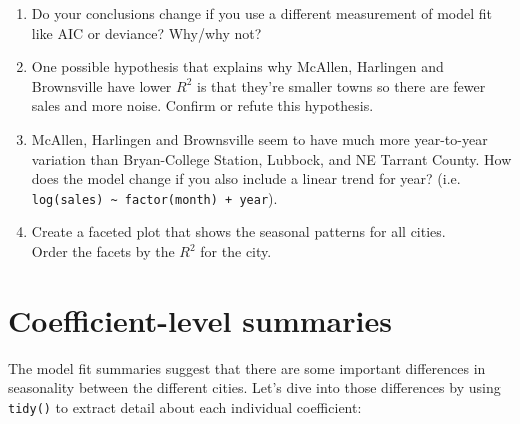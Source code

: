 \begin{enumerate}
\def\labelenumi{\arabic{enumi}.}
\item
  Do your conclusions change if you use a different measurement of model
  fit like AIC or deviance? Why/why not?
\item
  One possible hypothesis that explains why McAllen, Harlingen and
  Brownsville have lower \(R^2\) is that they're smaller towns so there
  are fewer sales and more noise. Confirm or refute this hypothesis.
\item
  McAllen, Harlingen and Brownsville seem to have much more year-to-year
  variation than Bryan-College Station, Lubbock, and NE Tarrant County.
  How does the model change if you also include a linear trend for year?
  (i.e. \texttt{log(sales)\ \textasciitilde{}\ factor(month)\ +\ year}).
\item
  Create a faceted plot that shows the seasonal patterns for all
  cities.\\
  Order the facets by the \(R^2\) for the city.
\end{enumerate}

\section{Coefficient-level summaries}\label{coefficient-level-summaries}

The model fit summaries suggest that there are some important
differences in seasonality between the different cities. Let's dive into
those differences by using \texttt{tidy()} to extract detail about each
individual coefficient: 

\begin{Shaded}
\end{Shaded}

